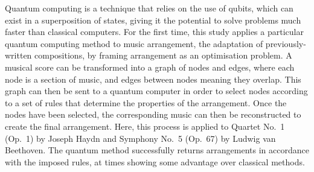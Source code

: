 \documentclass[12pt]{article}
\theoremstyle{definition}
\begin{document}
Quantum computing is a technique that relies on the use of qubits, which can exist in a superposition of states, giving it the potential to solve problems much faster than classical computers. For the first time, this study applies a particular quantum computing method to music arrangement, the adaptation of previously-written compositions, by framing arrangement as an optimisation problem. A musical score can be transformed into a graph of nodes and edges, where each node is a section of music, and edges between nodes meaning they overlap. This graph can then be sent to a quantum computer in order to select nodes according to a set of rules that determine the properties of the arrangement. Once the nodes have been selected, the corresponding music can then be reconstructed to create the final arrangement. Here, this process is applied to Quartet No.\ 1 (Op.\ 1) by Joseph Haydn and Symphony No.\ 5 (Op.\ 67) by Ludwig van Beethoven. The quantum method successfully returns arrangements in accordance with the imposed rules, at times showing some advantage over classical methods.
\end{document}
